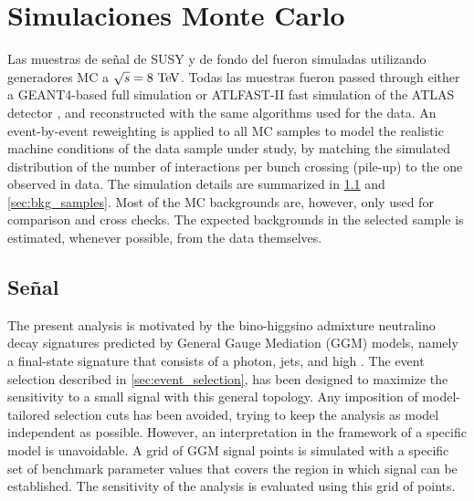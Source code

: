 \chapter{Simulaciones Monte Carlo}

Las muestras de se\~nal de SUSY y de fondo del {\SM} fueron simuladas utilizando generadores MC
a $\sqrt{s}=8\tev$.
Todas las muestras fueron passed through either a GEANT4-based full simulation \cite{Geant4,AtlasSim}
or ATLFAST-II fast simulation \cite{Richter-Was:683751} of the ATLAS detector \cite{Geant4,AtlasSim},
and reconstructed with the same algorithms used for the data. An event-by-event reweighting is
applied to all MC samples to model the realistic machine conditions of the data sample
under study, by matching the simulated distribution of the number of interactions per bunch
crossing (pile-up) to the one observed in data.
The simulation details are summarized in {\Sec} \ref{sec:sig_samples} and \ref{sec:bkg_samples}.
Most of the MC backgrounds are, however, only used for comparison and cross checks.
The expected backgrounds in the selected sample is estimated, whenever possible,
from the data themselves. %

\section{Se\~nal}\label{sec:sig_samples}

The present analysis is motivated by the bino-higgsino admixture neutralino decay signatures predicted by General Gauge Mediation (GGM) models,
namely a final-state signature that consists of a photon, jets, and high \MET. The event selection described in {\Sec} \ref{sec:event_selection},
has been designed to maximize the sensitivity to a small signal with this general topology. Any imposition of model-tailored selection cuts has been
avoided, trying to keep the analysis as model independent as possible. However, an interpretation in the framework of a specific model is unavoidable.
A grid of GGM signal points is simulated with a specific set of benchmark parameter values that covers the region in which signal can be established.
The sensitivity of the analysis is evaluated using this grid of points.

